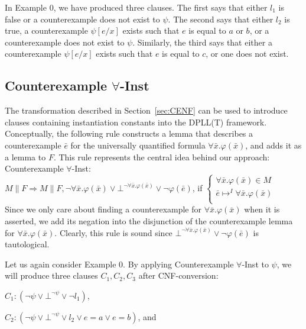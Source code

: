 \documentclass{llncs}
\begin{document}
In Example 0, we have produced three clauses.
The first says that either $l_1$ is false or a counterexample does not exist to $\psi$.
The second says that either $l_2$ is true, a counterexample $\psi[e/x]$ exists such that $e$ is equal to $a$ or $b$, or a counterexample does not exist to $\psi$. 
Similarly, the third says that either a counterexample $\psi[e/x]$ exists such that $e$ is equal to $c$, or one does not exist.

\subsection{Counterexample $\forall$-Inst}

The transformation described in Section~\ref{sec:CENF} can be used to introduce clauses containing instantiation constants into the DPLL(T) framework.
Conceptually, the following rule constructs a lemma that describes a counterexample $\bar{e}$ for the universally quantified formula $\forall \bar{x}. \varphi( \bar{ x } )$, and adds it as a lemma to $F$.
This rule represents the central idea behind our approach: \\

\noindent Counterexample $\forall$-Inst: \\

$M \parallel F \Longrightarrow M \parallel F, \neg \forall \bar{x}. \varphi( \bar{x} ) \vee \bot^{\neg \forall \bar{x}. \varphi( \bar{x} )} \vee \neg \varphi( \bar{ e } )$, if   
$\begin{cases}
  \forall \bar{x}. \varphi( \bar{ x } ) \in M \\
  \bar{ e } \mapsto^I \forall \bar{x}. \varphi( \bar{ x } ) \\
\end{cases}$ \\

Since we only care about finding a counterexample for $\forall \bar{x}. \varphi( \bar{x} )$ when it is asserted, we add its negation into the disjunction of the counterexample lemma for $\forall \bar{x}. \varphi( \bar{x} )$.
Clearly, this rule is sound since $\bot^{\neg \forall \bar{x}. \varphi( \bar{x} )} \vee \neg \varphi( \bar{ e } )$ is tautological.

Let us again consider Example 0.
By applying Counterexample $\forall$-Inst to $\psi$, we will produce three clauses $C_1, C_2, C_3$ after CNF-conversion:

$C_1 : ( \neg \psi \vee \bot^{\neg \psi} \vee \neg l_1)$,

$C_2 : ( \neg \psi \vee \bot^{\neg \psi} \vee l_2 \vee e = a \vee e = b )$, and
\end{document}
